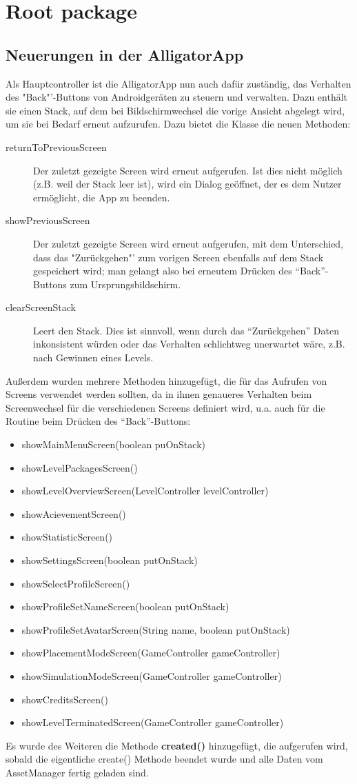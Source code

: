 \section{Root package}

\subsection{Neuerungen in der AlligatorApp}

Als Hauptcontroller ist die AlligatorApp nun auch dafür zuständig, das Verhalten des "Back"'-Buttons von Androidgeräten zu steuern und verwalten. Dazu enthält sie einen Stack, auf dem bei Bildschirmwechsel die vorige Ansicht abgelegt wird, um sie bei Bedarf erneut aufzurufen. Dazu bietet die Klasse die neuen Methoden:
\begin{description}
	\item[returnToPreviousScreen] Der zuletzt gezeigte Screen wird erneut aufgerufen. Ist dies nicht möglich (z.B. weil der Stack leer ist), wird ein Dialog geöffnet, der es dem Nutzer ermöglicht, die App zu beenden.
	\item[showPreviousScreen] Der zuletzt gezeigte Screen wird erneut aufgerufen, mit dem Unterschied, dass das "Zurückgehen"' zum vorigen Screen ebenfalls auf dem Stack gespeichert wird; man gelangt also bei erneutem Drücken des "`Back"'-Buttons zum Ursprungsbildschirm.
	\item[clearScreenStack] Leert den Stack. Dies ist sinnvoll, wenn durch das "`Zurückgehen"' Daten inkonsistent würden oder das Verhalten schlichtweg unerwartet wäre, z.B. nach Gewinnen eines Levels.
\end{description}

Außerdem wurden mehrere Methoden hinzugefügt, die für das Aufrufen von Screens verwendet werden sollten, da in ihnen genaueres Verhalten beim Screenwechsel für die verschiedenen Screens definiert wird, u.a. auch für die Routine beim Drücken des "`Back"'-Buttons:
\begin{itemize}
	\item showMainMenuScreen(boolean puOnStack)
	\item showLevelPackagesScreen()
	\item showLevelOverviewScreen(LevelController levelController)
	\item showAcievementScreen()
	\item showStatisticScreen()
	\item showSettingsScreen(boolean putOnStack)
	\item showSelectProfileScreen()
	\item showProfileSetNameScreen(boolean putOnStack)
	\item showProfileSetAvatarScreen(String name, boolean putOnStack)
	\item showPlacementModeScreen(GameController gameController)
	\item showSimulationModeScreen(GameController gameController)
	\item showCreditsScreen()
	\item showLevelTerminatedScreen(GameController gameController)
\end{itemize}

Es wurde des Weiteren die Methode \textbf{created()} hinzugefügt, die aufgerufen wird, sobald die eigentliche create() Methode beendet wurde und alle Daten vom AssetManager fertig geladen sind.
 
